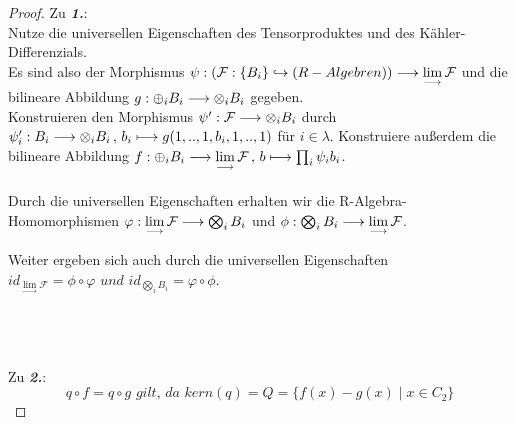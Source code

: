 \documentclass[10pt,a4paper]{report}
\newcommand{\functionfront}[3]{\nolinebreak{#1:#2 \longrightarrow #3}}
\newcommand{\function}[5]{\nolinebreak{#1:#2 \longrightarrow #3 \, , \, #4 \longmapsto #5}}
\newcommand{\colimes}[0]{\lim\limits_{ \longrightarrow }}
\newcommand{\infunctionfront}[3]{\nolinebreak{#1:#2 \hookrightarrow #3}}
\newcommand{\kernel}[1]{kern(#1)}
\begin{document}
\begin{proof}
Zu \textit{\textbf{1.}}:\ \\
Nutze die universellen Eigenschaften des Tensorproduktes und des Kähler-Differenzials.\\
Es sind also der Morphismus $\functionfront{\psi}{(\infunctionfront{\mathcal{F}}{\lbrace B_i \rbrace}{(R-Algebren)})}{\colimes \mathcal{F}}$ und die bilineare Abbildung $\functionfront{g}{\oplus_i B_i}{\otimes_i B_i}$ gegeben.\\
Konstruieren den Morphismus $\functionfront{\psi'}{\mathcal{F}}{\otimes_i B_i}$ durch $\function{\psi'_i}{B_i}{\otimes_i B_i}{b_i}{g(1,..,1,b_i,1,..,1)}$ für $i \in \lambda$. Konstruiere außerdem die bilineare Abbildung $\function{f}{\oplus_i B_i}{\colimes \mathcal{F}}{b}{\prod_i \psi_i b_i}$.\\
\ \\
Durch die universellen Eigenschaften erhalten wir die R-Algebra-Homomorphismen $\functionfront{\varphi}{\colimes \mathcal{F}}{\bigotimes _i B_i}$ und $\functionfront{\phi}{\bigotimes _i B_i}{\colimes \mathcal{F}}$.
\begin{center}
\end{center}
Weiter ergeben sich auch durch die universellen Eigenschaften\\ $id_{\colimes \mathcal{F}} = \phi \circ \varphi \textit{ und } id_{\bigotimes_i B_i} = \varphi \circ \phi$.
\begin{center}
\end{center}
\ \\
\ \\
\ \\
Zu \textit{\textbf{2.}}:\
$$q \circ f = q \circ g \textit{ gilt, da } \kernel{q} = Q = \lbrace f(x) - g(x)\mid x \in C_2 \rbrace$$


\end{proof}
\end{document}
